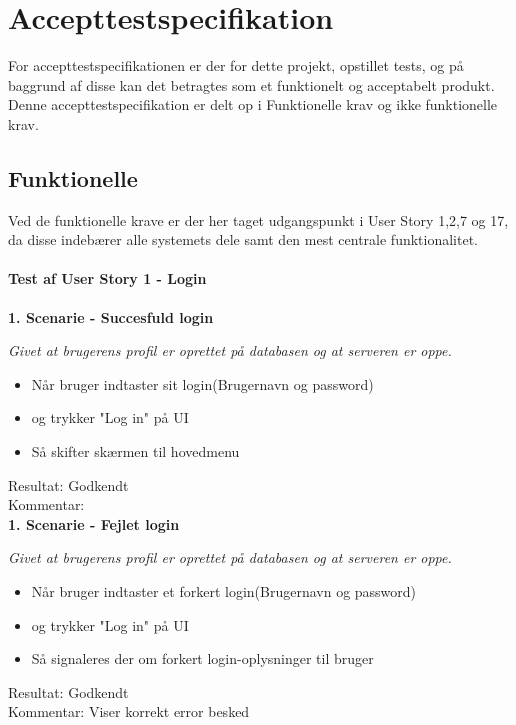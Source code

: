 \section{Accepttestspecifikation}
For accepttestspecifikationen er der for dette projekt, opstillet tests, og på baggrund af disse kan det betragtes som et funktionelt og acceptabelt produkt. 
Denne accepttestspecifikation er delt op i Funktionelle krav og ikke funktionelle krav.

\subsection{Funktionelle}
Ved de funktionelle krave er der her taget udgangspunkt i User Story 1,2,7 og 17, da disse indebærer alle systemets dele samt den mest centrale funktionalitet.\\
\paragraph{Test af User Story 1 - Login}

\textbf{1. Scenarie - Succesfuld login}

\textit{Givet at brugerens profil er oprettet på databasen og at serveren er oppe.}

\begin{itemize}
  \item Når bruger indtaster sit login(Brugernavn og password)
  \item og trykker "Log in" på UI
  \item Så skifter skærmen til hovedmenu
\end{itemize}

Resultat: Godkendt\\
Kommentar:\\

\textbf{1. Scenarie - Fejlet login}

\textit{Givet at brugerens profil er oprettet på databasen og at serveren er oppe.}

\begin{itemize}
  \item Når bruger indtaster et forkert login(Brugernavn og password)
  \item og trykker "Log in" på UI
  \item Så signaleres der om forkert login-oplysninger til bruger
\end{itemize}

Resultat: Godkendt\\
Kommentar: Viser korrekt error besked\\

